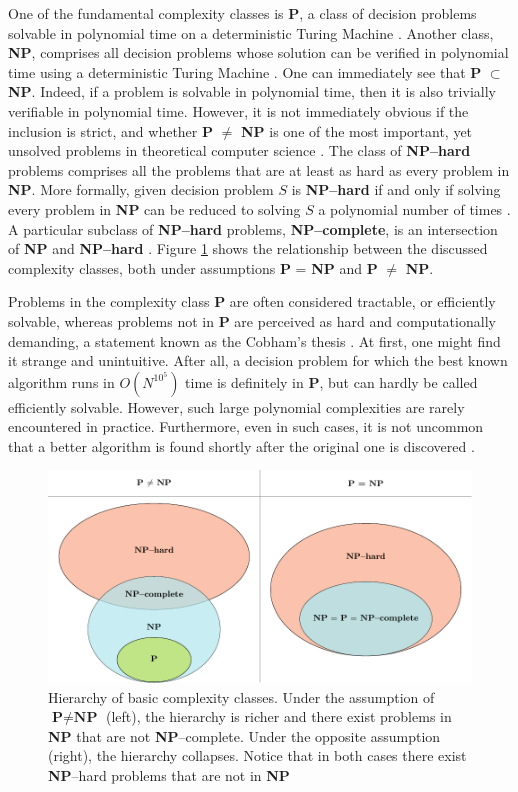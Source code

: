 One of the fundamental complexity classes is \textbf{P}, a class of decision
problems solvable in polynomial time on a deterministic Turing Machine
\cite{arora}. Another class, \textbf{NP}, comprises all decision problems whose
solution can be verified in polynomial time using a deterministic Turing
Machine \cite{arora}. One can immediately see that \textbf{P} $\subset$
\textbf{NP}. Indeed, if a problem is solvable in polynomial time, then it is
also trivially verifiable in polynomial time. However, it is not immediately
obvious if the inclusion is strict, and whether \textbf{P} $\ne$ \textbf{NP} is
one of the most important, yet unsolved problems in theoretical computer
science \cite{fortnow}. The class of \textbf{NP--hard} problems comprises all
the problems that are at least as hard as every problem in \textbf{NP}. More
formally, given decision problem $S$ is \textbf{NP--hard} if and only if
solving every problem in \textbf{NP} can be reduced to solving $S$ a polynomial
number of times \cite{arora}. A particular subclass of \textbf{NP--hard}
problems, \textbf{NP--complete}, is an intersection of \textbf{NP} and
\textbf{NP--hard} \cite{arora}. Figure \ref{fig:complexity} shows the
relationship between the discussed complexity classes, both under assumptions
\textbf{P} = \textbf{NP} and \textbf{P} $\ne$ \textbf{NP}.

Problems in the complexity class \textbf{P} are often considered tractable, or
efficiently solvable, whereas problems not in \textbf{P} are perceived as hard
and computationally demanding, a statement known as the Cobham's thesis
\cite{cobham, arora}. At first, one might find it strange and unintuitive.
After all, a decision problem for which the best known algorithm runs in
$O(N^{10^5})$ time is definitely in \textbf{P}, but can hardly be called
efficiently solvable. However, such large polynomial complexities are rarely
encountered in practice. Furthermore, even in such cases, it is not uncommon
that a better algorithm is found shortly after the original one is discovered
\cite{arora}.

\begin{figure}
  \includegraphics[width=\textwidth]{figures/complexity_new.pdf}
  \caption{Hierarchy of basic complexity classes. Under the assumption of $\textbf{P} \ne \textbf{NP}$ (left), the hierarchy is richer and there exist problems in \textbf{NP}  that are not \textbf{NP}--complete. Under the opposite assumption (right), the hierarchy collapses. Notice that in both cases there exist \textbf{NP}--hard problems that are not in \textbf{NP}
  }
  \label{fig:complexity}
\end{figure}

